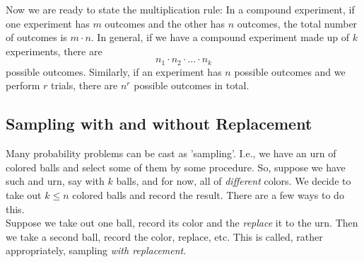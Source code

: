 \documentclass[12pt]{article} %
\newtheorem{example}{Example}
\begin{document}
   

Now we are ready to state the multiplication rule: In a compound experiment, if one experiment has $m$ outcomes and the other has $n$ outcomes, the total number of outcomes is $m\cdot n$. In general, if we have a compound experiment made up of $k$ experiments, there are 
$$n_1\cdot n_2\cdot...\cdot n_k$$
possible outcomes. Similarly, if an experiment has $n$ possible outcomes and we perform $r$ trials, there are $n^r$ possible outcomes in total.
\subsection{Sampling with and without Replacement}
Many probability problems can be cast as 'sampling'. I.e., we have an urn of colored balls and select some of them by some procedure. So, suppose we have such and urn, say with $k$ balls, and for now, all of \emph{different} colors. We decide to take out $k\leq n$ colored balls and record the result. There are a few ways to do this.\\

Suppose we take out one ball, record its color and the \emph{replace} it to the urn. Then we take a second ball, record the color, replace, etc. This is called, rather appropriately, sampling \emph{with replacement}.\\
\end{document}
